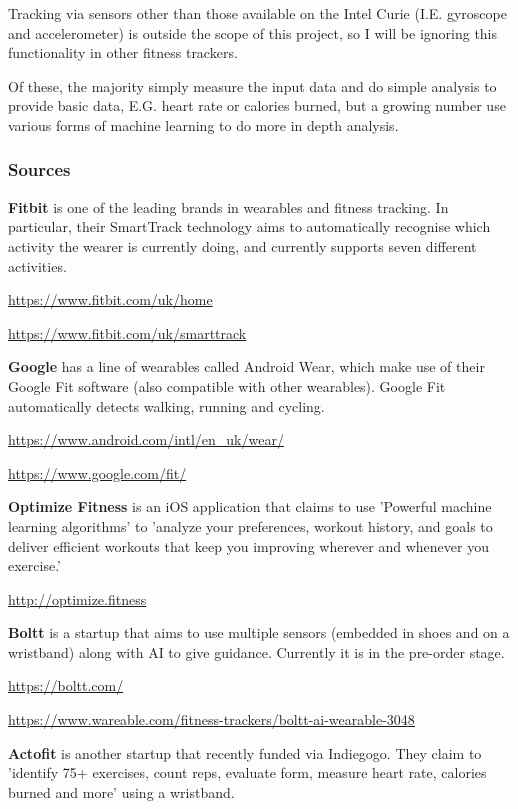 \documentclass[a4paper]{article}
\begin{document}
Tracking via sensors other than those available on the Intel Curie (I.E. gyroscope and accelerometer) is outside the scope of this project, so I will be ignoring this functionality in other fitness trackers.

Of these, the majority simply measure the input data and do simple analysis to provide basic data, E.G. heart rate or calories burned, but a growing number use various forms of machine learning to do more in depth analysis. 

\subsubsection{Sources}

\textbf{Fitbit} is one of the leading brands in wearables and fitness tracking. In particular, their SmartTrack technology aims to automatically recognise which activity the wearer is currently doing, and currently supports seven different activities.

\url{https://www.fitbit.com/uk/home}

\url{https://www.fitbit.com/uk/smarttrack}

\textbf{Google} has a line of wearables called Android Wear, which make use of their Google Fit software (also compatible with other wearables).
Google Fit automatically detects walking, running and cycling.

\url{https://www.android.com/intl/en_uk/wear/}

\url{https://www.google.com/fit/}

\textbf{Optimize Fitness} is an iOS application that claims to use 'Powerful machine learning algorithms' to 'analyze your preferences, workout history, and goals to deliver efficient workouts that keep you improving wherever and whenever you exercise.'

\url{http://optimize.fitness}

\textbf{Boltt} is a startup that aims to use multiple sensors (embedded in shoes and on a wristband) along with AI to give guidance. Currently it is in the pre-order stage.

\url{https://boltt.com/}

\url{https://www.wareable.com/fitness-trackers/boltt-ai-wearable-3048}

\textbf{Actofit} is another startup that recently funded via Indiegogo. They claim to 'identify 75+ exercises, count reps, evaluate form, measure heart rate, calories burned and more' using a wristband.
\end{document}
